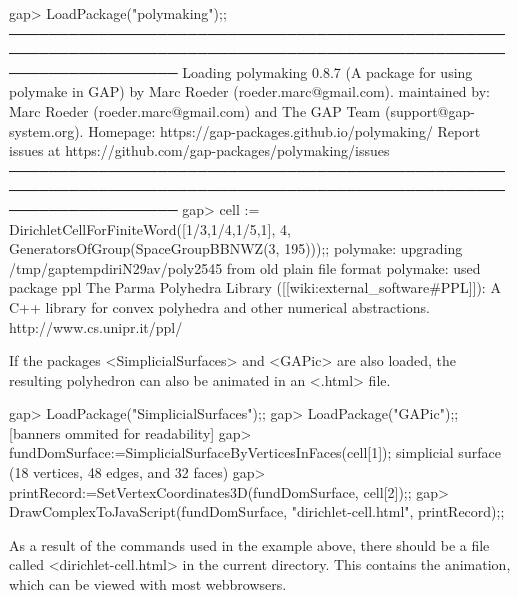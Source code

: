 \beginexample
gap> LoadPackage("polymaking");;
─────────────────────────────────────────────────────────────────────────────────────────────────────────────────────
Loading polymaking 0.8.7 (A package for using polymake in GAP)
by Marc Roeder (roeder.marc@gmail.com).
maintained by:
   Marc Roeder (roeder.marc@gmail.com) and
   The GAP Team (support@gap-system.org).
Homepage: https://gap-packages.github.io/polymaking/
Report issues at https://github.com/gap-packages/polymaking/issues
─────────────────────────────────────────────────────────────────────────────────────────────────────────────────────
gap> cell := DirichletCellForFiniteWord([1/3,1/4,1/5,1], 4, 
                                        GeneratorsOfGroup(SpaceGroupBBNWZ(3, 195)));;
polymake: upgrading /tmp/gaptempdiriN29av/poly2545 from old plain file format
polymake: used package ppl
  The Parma Polyhedra Library ([[wiki:external_software#PPL]]): A C++ library for 
  convex polyhedra and other numerical abstractions.
  http://www.cs.unipr.it/ppl/
\endexample

If the packages <SimplicialSurfaces> and <GAPic> are also loaded, the resulting polyhedron can also be animated in an <.html> file.

\beginexample
gap> LoadPackage("SimplicialSurfaces");;
gap> LoadPackage("GAPic");;
[banners ommited for readability]
gap> fundDomSurface:=SimplicialSurfaceByVerticesInFaces(cell[1]);
simplicial surface (18 vertices, 48 edges, and 32 faces)
gap> printRecord:=SetVertexCoordinates3D(fundDomSurface, cell[2]);;
gap> DrawComplexToJavaScript(fundDomSurface, "dirichlet-cell.html", printRecord);;
\endexample

As a result of the commands used in the example above, there should be a file called <dirichlet-cell.html> in the current directory. This contains the animation, which can be viewed with most webbrowsers.